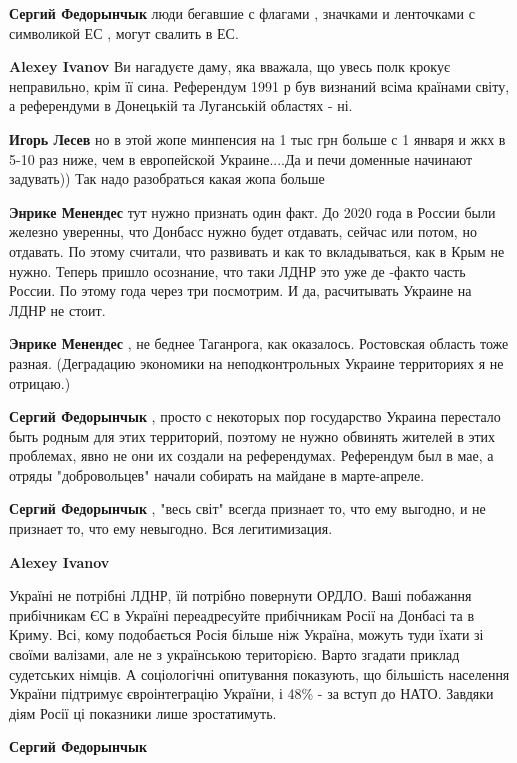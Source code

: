 \begin{itemize}
\begin{itemize}
\textbf{Сергий Федорынчык} люди бегавшие с флагами , значками и ленточками с символикой ЕС , могут свалить в ЕС.

\textbf{Alexey Ivanov} Ви нагадуєте даму, яка вважала, що увесь полк крокує неправильно, крім її сина. Референдум 1991 р був визнаний всіма країнами світу, а референдуми в Донецькій та Луганській областях - ні.

\textbf{Игорь Лесев} но в этой жопе минпенсия на 1 тыс грн больше с 1 января и жкх в 5-10 раз ниже, чем в европейской Украине....Да и печи доменные начинают задувать)) Так надо разобраться какая жопа больше

\textbf{Энрике Менендес} тут нужно признать один факт. До 2020 года в России
были железно уверенны, что Донбасс нужно будет отдавать, сейчас или потом, но
отдавать. По этому считали, что развивать и как то вкладываться, как в Крым не
нужно. Теперь пришло осознание, что таки ЛДНР это уже де -факто часть России.
По этому года через три посмотрим. И да, расчитывать Украине на ЛДНР не стоит.

\textbf{Энрике Менендес} , не беднее Таганрога, как оказалось. Ростовская область тоже разная.
(Деградацию экономики на неподконтрольных Украине территориях я не отрицаю.)

\textbf{Сергий Федорынчык} , просто с некоторых пор государство Украина перестало быть родным для этих территорий, поэтому не нужно обвинять жителей в этих проблемах, явно не они их создали на референдумах. Референдум был в мае, а отряды "добровольцев" начали собирать на майдане в марте-апреле.

\textbf{Сергий Федорынчык} , "весь світ" всегда признает то, что ему выгодно, и не признает то, что ему невыгодно. Вся легитимизация.

\textbf{Alexey Ivanov} 

Україні не потрібні ЛДНР, їй потрібно повернути ОРДЛО. Ваші побажання
прибічникам ЄС в Україні переадресуйте прибічникам Росії на Донбасі та в Криму.
Всі, кому подобається Росія більше ніж Україна, можуть туди їхати зі своїми
валізами, але не з українською територією. Варто згадати приклад судетських
німців. А соціологічні опитування показують, що більшість населення України
підтримує євроінтеграцію України, і 48\% - за вступ до НАТО. Завдяки діям Росії
ці показники лише зростатимуть.

\textbf{Сергий Федорынчык} 


\end{itemize}
\end{itemize}
